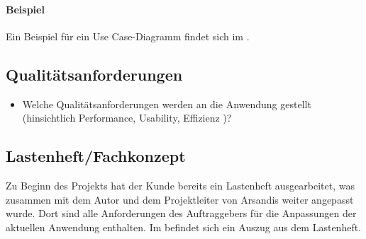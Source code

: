 \paragraph{Beispiel}
Ein Beispiel für ein Use Case-Diagramm findet sich im .


\subsection{Qualitätsanforderungen}
\label{sec:Qualitaetsanforderungen}
\begin{itemize}
	\item Welche Qualitätsanforderungen werden an die Anwendung gestellt (\zB hinsichtlich Performance, Usability, Effizienz \etc )?
\end{itemize}


\subsection{Lastenheft/Fachkonzept}
\label{sec:Lastenheft}
Zu Beginn des Projekts hat der Kunde bereits ein Lastenheft ausgearbeitet, was zusammen mit dem Autor und dem Projektleiter von Arsandis weiter angepasst wurde.
Dort sind alle Anforderungen des Auftraggebers für die Anpassungen der aktuellen Anwendung enthalten.
Im  befindet sich ein Auszug aus dem Lastenheft.

